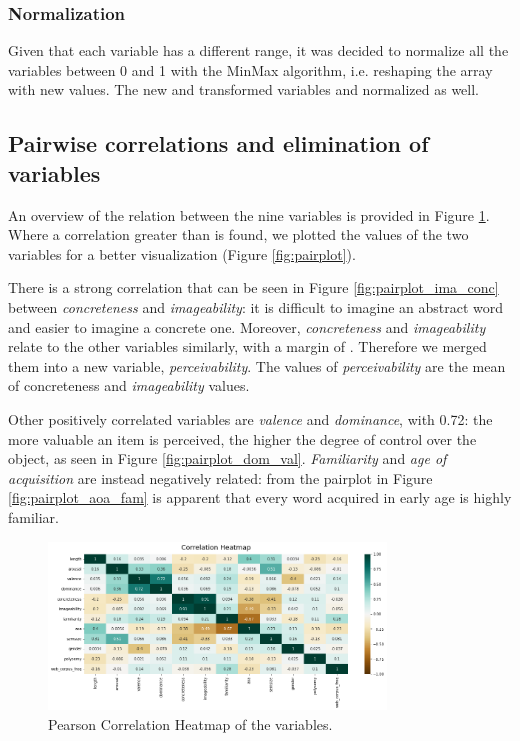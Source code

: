 \documentclass[a4paper,11pt,dvipsnames]{article}
\begin{document}
\subsubsection{Normalization}\label{normalization}

Given that each variable has a different range, it was decided to normalize all the variables between 0 and 1 with the MinMax algorithm, i.e. reshaping the array with new values. The new and transformed variables and normalized as well.



\subsection[Pairwise correlations]{Pairwise correlations and elimination of variables}
An overview of the relation between the nine variables is provided in Figure \ref{fig:correlation}. Where a correlation greater than \textbar{} is found, we plotted the values of the two variables for a better visualization (Figure \ref{fig:pairplot}). 

There is a strong correlation that can be seen in Figure \ref{fig:pairplot_ima_conc} between \textit{concreteness} and \textit{imageability}: it is difficult to imagine an abstract word and easier to imagine a concrete one.  Moreover, \textit{concreteness} and \textit{imageability} relate to the other variables similarly, with a margin of . Therefore we merged them into a new variable, \textit{perceivability}. The values of \textit{perceivability} are the mean of concreteness and \textit{imageability} values. 

Other positively correlated variables are \textit{valence} and \textit{dominance}, with 0.72: the more valuable an item is perceived, the higher the degree of control over the object, as seen in Figure \ref{fig:pairplot_dom_val}. 
\textit{Familiarity} and \textit{age of acquisition} are instead negatively related: from the pairplot in Figure \ref{fig:pairplot_aoa_fam} is apparent that every word acquired in early age is highly familiar. 


\begin{figure}[h]
    \centering
    \includegraphics[width=0.8\textwidth]{Graphs/heatmap.png}
    \caption{Pearson Correlation Heatmap of the variables.}
    \label{fig:correlation}
\end{figure}
\end{document}
